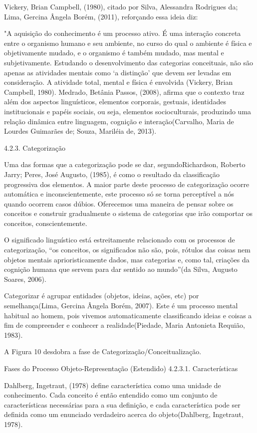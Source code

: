 Vickery, Brian Campbell, (1980), citado por Silva, Alessandra Rodrigues da; Lima, Gercina Ângela Borém, (2011), reforçando essa ideia diz:

"A aquisição do conhecimento é um processo ativo. É uma interação concreta entre o organismo humano e seu ambiente, no curso do qual o ambiente é física e objetivamente mudado, e o organismo é também mudado, mas mental e subjetivamente. Estudando o desenvolvimento das categorias conceituais, não são apenas as atividades mentais como ‘a distinção’ que devem ser levadas em consideração. A atividade total, mental e física é envolvida (Vickery, Brian Campbell, 1980).
Medrado, Betânia Passos, (2008), afirma que o contexto traz além dos aspectos linguísticos, elementos corporais, gestuais, identidades institucionais e papéis sociais, ou seja, elementos socioculturais, produzindo uma relação dinâmica entre linguagem, cognição e interação(Carvalho, Maria de Lourdes Guimarães de; Souza, Mariléia de, 2013).

4.2.3. Categorização

Uma das formas que a categorização pode se dar, segundoRichardson, Roberto Jarry; Peres, José Augusto, (1985), é como o resultado da classificação progressiva dos elementos. A maior parte deste processo de categorização ocorre automática e inconscientemente, este processo só se torna perceptível a nós quando ocorrem casos dúbios. Oferecemos uma maneira de pensar sobre os conceitos e construir gradualmente o sistema de categorias que irão comportar os conceitos, conscientemente.

O significado linguístico está estreitamente relacionado com os processos de categorização, ``os conceitos, os significados não são, pois, rótulos das coisas nem objetos mentais aprioristicamente dados, mas categorias e, como tal, criações da cognição humana que servem para dar sentido ao mundo”(da Silva, Augusto Soares, 2006).

Categorizar é agrupar entidades (objetos, ideias, ações, etc) por semelhança(Lima, Gercina Ângela Borém, 2007). Este é um processo mental habitual ao homem, pois vivemos automaticamente classificando ideias e coisas a fim de compreender e conhecer a realidade(Piedade, Maria Antonieta Requião, 1983).

A Figura 10 desdobra a fase de Categorização/Conceitualização.


Fases do Processo Objeto-Representação (Estendido)
4.2.3.1. Características

Dahlberg, Ingetraut, (1978) define característica como uma unidade de conhecimento. Cada conceito é então entendido como um conjunto de características necessárias para a sua definição, e cada característica pode ser definida como um enunciado verdadeiro acerca do objeto(Dahlberg, Ingetraut, 1978).

